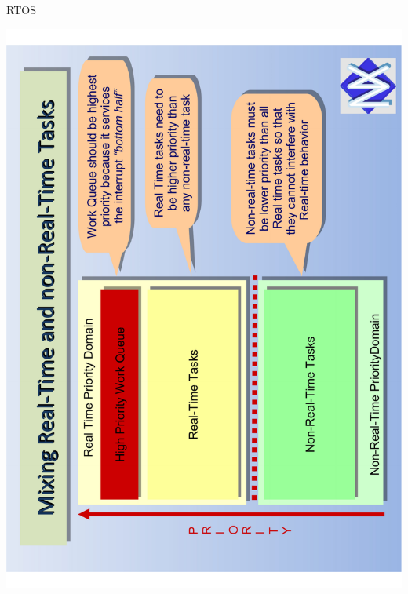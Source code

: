 \documentclass[aspectratio=169]{beamer}
\begin{document}
\begin{frame}{RTOS}
\begin{minipage}{0.5\textwidth}
\begin{overprint}
	\centering\includegraphics[angle=-90,origin=c,width=0.95\linewidth]{mistura.pdf}
  \end{overprint}
\end{minipage}

\end{frame}

\end{document}

